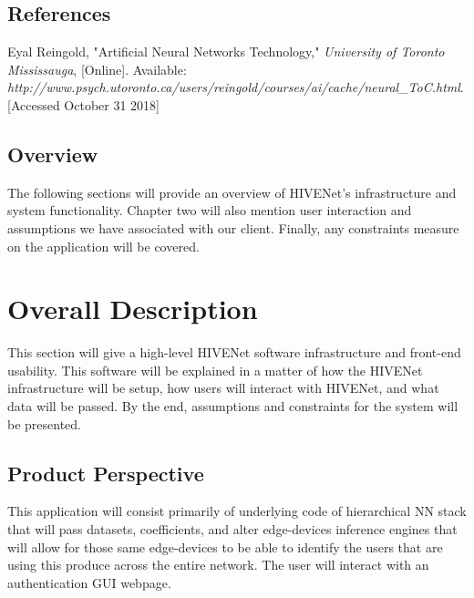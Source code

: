 \documentclass[onecolumn, draftclsnofoot,10pt, compsoc]{IEEEtran}
\begin{document}
	\subsection{References}
\begin{thebibliography}{10}
	
	Eyal Reingold,
	"Artificial Neural Networks Technology,"
	\textit{University of Toronto Mississauga},
	[Online].
	Available: \\\textit{http://www.psych.utoronto.ca/users/reingold/courses/ai/cache/neural\_ToC.html}.
	[Accessed October 31 2018]

\end{thebibliography}

	\subsection{Overview}
The following sections will provide an overview of HIVENet's infrastructure and system functionality. 
Chapter two will also mention user interaction and assumptions we have associated with our client.
Finally, any constraints measure on the application will be covered.

	\newpage


\section{Overall Description}
This section will give a high-level HIVENet software infrastructure and front-end usability.
This software will be explained in a matter of how the HIVENet infrastructure will be setup, how users will interact with HIVENet, and what data will be passed.
By the end, assumptions and constraints for the system will be presented.

	\subsection{Product Perspective}
This application will consist primarily of underlying code of hierarchical NN stack that will pass datasets, coefficients, and alter edge-devices inference engines that will allow for those same edge-devices to be able to identify the users that are using this produce across the entire network.
The user will interact with an authentication GUI webpage. %
\end{document}
